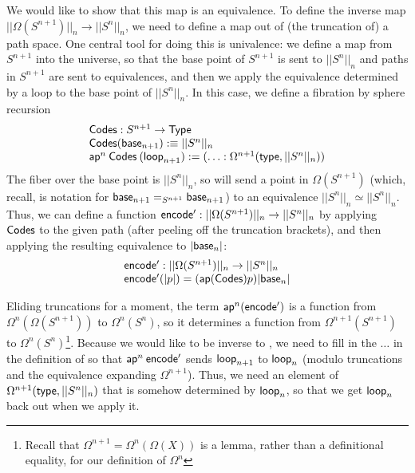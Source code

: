 We would like to show that this map is an equivalence.  To define the
inverse map $||\Omega(S^{n+1})||_n \to ||S^n||_n$, we need to define a
map out of (the truncation of) a path space.  One central tool for doing
this is univalence: we define a map from $S^{n+1}$ into the universe, so
that the base point of $S^{n+1}$ is sent to $||S^n||_n$ and paths in $S^{n+1}$
are sent to equivalences, and then we apply the
equivalence determined by a loop to the base point of $||S^n||_n$.  In
this case, we define a fibration  by sphere recursion
\[
\begin{array}{l}
\mathsf{Codes} : S^{n+1} \to \mathsf{Type} \\
\mathsf{Codes}(\mathsf{base}_{n+1}) :\equiv ||S^{n}||_n \\
\mathsf{ap}^n \: \mathsf{Codes} \: (\mathsf{loop}_{n+1}) := (\ldots : \Omega^{n+1}(\mathsf{type},||S^{n}||_n)) \\
\end{array}
\]
The fiber over the base point is $||S^{n}||_n$, so  will send a
point in $\Omega(S^{n+1})$ (which, recall, is notation for $\mathsf{base}_{n+1}
=_{S^{n+1}} \mathsf{base}_{n+1}$) to an equivalence $||S^{n}||_n \simeq
||S^{n}||_n$.  Thus, we can define a function $\mathsf{encode'} : ||\Omega(S^{n+1})||_n \to
||S^n||_n$ by applying $\mathsf{Codes}$ to the given path (after peeling
off the truncation brackets), and then
applying the resulting equivalence to $|\mathsf{base}_n|$:
\[
\begin{array}{l}
\mathsf{encode'} : ||\Omega(S^{n+1})||_n \to ||S^n||_n \\
\mathsf{encode'}(|p|) = (\mathsf{ap}(\mathsf{Codes}) p) |\mathsf{base}_n|
\end{array}
\]

Eliding truncations for a moment, the term $\mathsf{ap}^n(\mathsf{encode'})$
is a function from $\Omega^n(\Omega(S^{n+1}))$ to $\Omega^n(S^n)$, so it
determines a function from $\Omega^{n+1}(S^{n+1})$ to
$\Omega^n(S^n)$\footnote{Recall that $\Omega^{n+1} =
  \Omega^n(\Omega(X))$ is a lemma, rather than a definitional equality,
  for our definition of $\Omega^n$}.  Because we would like 
to be inverse to , we need to fill in the $\ldots$ in the
definition of  so that $\mathsf{ap}^n \: \mathsf{encode'}$ sends
$\mathsf{loop}_{n+1}$ to $\mathsf{loop}_n$ (modulo truncations and the
equivalence expanding $\Omega^{n+1}$).  Thus, we need an element of
$\Omega^{n+1}(\mathsf{type},||S^n||_n)$ that is somehow determined by 
$\mathsf{loop}_n$, so that we get $\mathsf{loop}_n$ back out when we apply it.  

